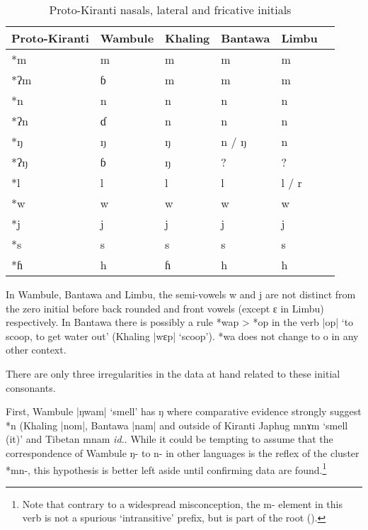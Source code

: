\documentclass[oneside,a4paper,11pt]{article}
\newcommand{\ipa}[1]{{\phon\mbox{#1}}} %
\newcommand{\dhatu}[2]{|\ipa{#1}| `#2'}
\begin{document}
\begin{table}[H]
\caption{Proto-Kiranti nasals, lateral and fricative initials} \centering \label{tab:nasals}
\begin{tabular}{llllll}
\toprule
Proto-Kiranti & Wambule & Khaling & Bantawa & Limbu \\
\midrule
\ipa{*m} & \ipa{m} & \ipa{m} & \ipa{m} & \ipa{m}  \\
\ipa{*ʔm} & \ipa{ɓ} & \ipa{m} & \ipa{m} & \ipa{m}  \\
\ipa{*n} & \ipa{n} & \ipa{n} & \ipa{n} & \ipa{n}  \\
\ipa{*ʔn} & \ipa{ɗ} & \ipa{n} & \ipa{n} & \ipa{n}  \\
\ipa{*ŋ} & \ipa{ŋ} & \ipa{ŋ} & \ipa{n} / \ipa{ŋ} & \ipa{n}  \\
\ipa{*ʔŋ} &  \ipa{ɓ}  & \ipa{ŋ} & ? &?  \\
\ipa{*l} & \ipa{l} & \ipa{l} & \ipa{l} & \ipa{l} / \ipa{r} \\
\ipa{*w} & \ipa{w} & \ipa{w} & \ipa{w} & \ipa{w} \\
\ipa{*j} & \ipa{j} & \ipa{j} & \ipa{j} & \ipa{j} \\
\ipa{*s} & \ipa{s} & \ipa{s} & \ipa{s} & \ipa{s}  \\
\ipa{*ɦ} & \ipa{h} & \ipa{ɦ} & \ipa{h} & \ipa{h}  \\
\bottomrule
\end{tabular}
\end{table}

In Wambule, Bantawa and Limbu, the semi-vowels \ipa{w} and \ipa{j} are not distinct from the zero initial before back rounded and front vowels (except \ipa{ɛ} in Limbu) respectively. In Bantawa there is possibly a rule *\ipa{wap} > *\ipa{op} in the verb \dhatu{op}{to scoop, to get water out} (Khaling \dhatu{wɛp}{scoop}). *\ipa{wa} does not change to \ipa{o} in any other context.

There are only three irregularities in the data at hand related to these initial consonants.

First, Wambule \dhatu{ŋwam}{smell} has \ipa{ŋ} where comparative evidence strongly suggest *\ipa{n} (Khaling |\ipa{nom}|, Bantawa  |\ipa{nam}| and outside of Kiranti Japhug \ipa{mnɤm} `smell (it)' and Tibetan \ipa{mnam} \textit{id.}. While it could be tempting to assume that the correspondence of Wambule \ipa{ŋ-} to \ipa{n-} in other languages is the reflex of the cluster *\ipa{mn-}, this hypothesis is better left aside until confirming data are found.\footnote{Note that contrary to a widespread misconception, the \ipa{m-} element in this verb is not a spurious 
`intransitive' prefix, but is part of the root (\citealt{hill14derivational, jacques14snom}).}
\end{document}

